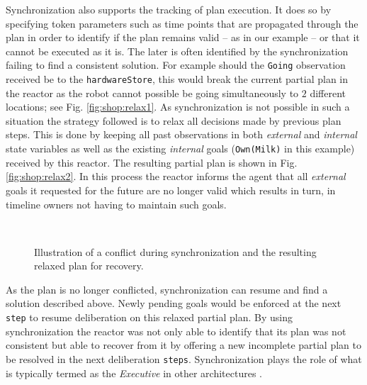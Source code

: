 Synchronization also supports the tracking of plan execution. It does
so by specifying token parameters such as time points that are
propagated through the plan in order to identify if the plan remains
valid -- as in our example -- or that it cannot be executed as it
is. The later is often identified by the synchronization failing to
find a consistent solution. For example should the \texttt{Going}
observation received be to the \texttt{hardwareStore}, this would
break the current partial plan in the reactor as the robot cannot
possible be going simultaneously to $2$ different locations; see
Fig. \ref{fig:shop:relax1}. As synchronization is not possible in such
a situation the strategy followed is to relax all decisions made by
previous plan steps. This is done by keeping all past observations in
both {\em external} and {\em internal} state variables as well as the
existing {\em internal} goals (\texttt{Own(Milk)} in this example)
received by this reactor. The resulting partial plan is shown in
Fig. \ref{fig:shop:relax2}. In this process the reactor informs the
agent that all {\em external} goals it requested for the future are no
longer valid which results in turn, in timeline owners not having to
maintain such goals.

\begin{figure}[!htbp]
  \centering
  \\
  \caption{\small Illustration of a conflict during synchronization
    and the resulting relaxed plan for recovery.}
\end{figure}

As the plan is no longer conflicted, synchronization can resume and
find a solution described above. Newly pending goals would be enforced
at the next \texttt{step} to resume deliberation on this relaxed
partial plan. By using synchronization the reactor was not only able
to identify that its plan was not consistent but able to recover from
it by offering a new incomplete partial plan to be resolved in the
next deliberation \texttt{steps}. %
Synchronization plays the role of what is typically termed as the {\em
  Executive} in other architectures \cite{gat98, alami:1998p820,
  mus98, williams03, Nesnas:2003do}.

